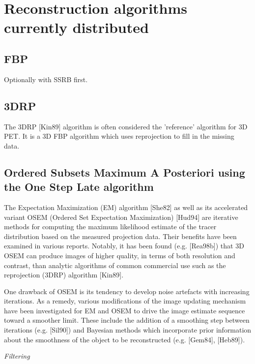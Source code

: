 \documentclass{article}
\begin{document}
\section{
Reconstruction algorithms currently distributed}

\subsection{FBP}
Optionally with SSRB first.

\subsection{3DRP}
The 3DRP [Kin89] algorithm is often considered the 'reference' 
algorithm for 3D PET. It is a 3D FBP algorithm which uses reprojection 
to fill in the missing data.

\subsection{
Ordered Subsets Maximum A Posteriori using the One Step Late 
algorithm}

The Expectation Maximization (EM) algorithm [She82] as well as 
its accelerated variant OSEM (Ordered Set Expectation Maximization) 
[Hud94] are iterative methods for computing the maximum likelihood 
estimate of the tracer distribution based on the measured projection 
data. Their benefits have been examined in various reports. Notably, 
it has been found (e.g. [Rea98b]) that 3D OSEM can produce images 
of higher quality, in terms of both resolution and contrast, 
than analytic algorithms of common commercial use such as the 
reprojection (3DRP) algorithm [Kin89].

One drawback of OSEM is its tendency to develop noise artefacts 
with increasing iterations. As a remedy, various modifications 
of the image updating mechanism have been investigated for EM 
and OSEM to drive the image estimate sequence toward a smoother 
limit. These include the addition of a smoothing step between 
iterations (e.g. [Sil90]) and Bayesian methods which incorporate 
prior information about the smoothness of the object to be reconstructed 
(e.g. [Gem84], [Heb89]).


\begin{spacing}{1.5}
\textit{Filtering}


\end{spacing}
\end{document}
